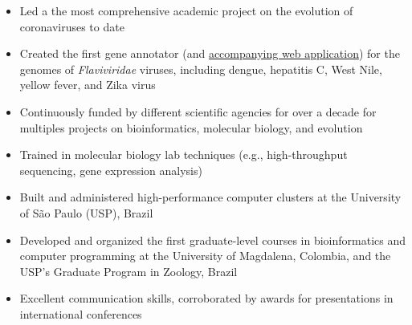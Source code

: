     \begin{itemize}
        \item Led a the most comprehensive academic project on the evolution of coronaviruses to date
        \item Created the first gene annotator (and \href{http://flavi-web.com/}{accompanying web application}) for the genomes of \textit{Flaviviridae} viruses, including dengue, hepatitis C, West Nile, yellow fever, and Zika virus
        \item Continuously funded by different scientific agencies for over a decade for multiples projects on bioinformatics, molecular biology, and evolution
        \item Trained in molecular biology lab techniques (e.g., high-throughput sequencing, gene expression analysis)
        \item Built and administered high-performance computer clusters at the University of São Paulo (USP), Brazil
        \item Developed and organized the first graduate-level courses in bioinformatics and computer programming at the University of Magdalena, Colombia, and the USP's Graduate Program in Zoology, Brazil
        \item Excellent communication skills, corroborated by awards for presentations in international conferences
    \end{itemize}

    \vspace{-0.5em}
